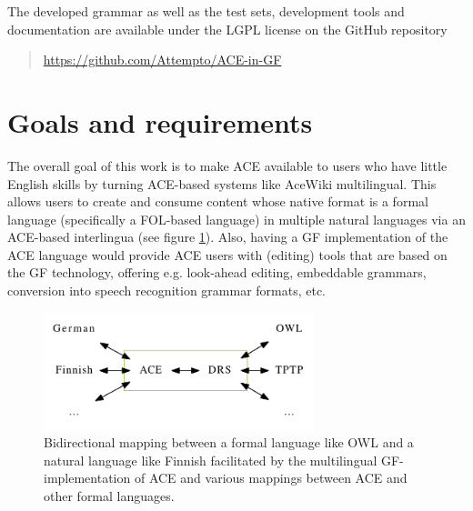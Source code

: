 \documentclass[a4paper]{article}
\begin{document}
The developed grammar as well as the test sets, development tools and
documentation are available under the LGPL license on the GitHub repository

\begin{quote}
\url{https://github.com/Attempto/ACE-in-GF}
\end{quote}

\section{Goals and requirements}
\label{section:Goals_and_requirements}

The overall goal of this work is to make ACE available to users who have little
English skills by turning ACE-based systems like
AceWiki \cite{kuhn2010doctoralthesis} multilingual. This allows users
to create and consume content whose native format is a formal language
(specifically a FOL-based language) in multiple natural languages
via an ACE-based interlingua (see figure \ref{fig:languages}).
Also, having a GF implementation of the ACE language would
provide ACE users with (editing) tools that are based on the GF technology,
offering e.g. look-ahead editing, embeddable grammars, conversion into
speech recognition grammar formats, etc.

\begin{figure}[ht]
\centering
\includegraphics[width=0.7\textwidth]{languages}
\caption[Languages]
{Bidirectional mapping between a formal language like OWL and a natural
language like Finnish facilitated by the multilingual GF-implementation of
ACE and various mappings between ACE and other formal languages.}
\label{fig:languages}
\end{figure}

%
\end{document}
